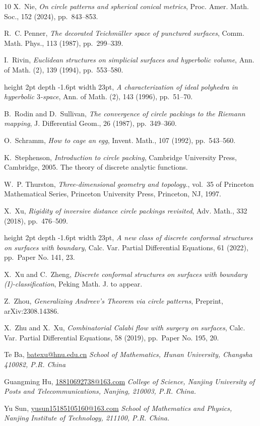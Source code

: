 \documentclass[11pt,leqno]{article}
\makeatletter
\numberwithin{equation}{section}
\newcommand{\Addresses}{{
  \bigskip
  \footnotesize
  \noindent Te Ba, \href{batexu@hnu.edu.cn}{batexu@hnu.edu.cn}
  \newline\textit{School of Mathematics, Hunan University, Changsha 410082, P.R. China}\par\nopagebreak
  \medskip
  \noindent Guangming Hu, \href{18810692738@163.com}{18810692738@163.com}
 \newline\textit{ College of Science, Nanjing University of Posts and Telecommunications,
  Nanjing, 210003, P.R. China.}\par\nopagebreak
  \medskip
 \noindent Yu Sun, \href{yusun15185105160@163.com}{yusun15185105160@163.com}
  \newline\textit{School of Mathematics and Physics, Nanjing Institute of Technology, 211100, P.R. China.}\par\nopagebreak
}}
\theoremstyle{definition}
\makeatother
\begin{document}
\begin{thebibliography}{10}
{\sc X.~Nie}, {\em On circle patterns and spherical conical metrics}, Proc.
  Amer. Math. Soc., 152 (2024), pp.~843--853.

{\sc R.~C. Penner}, {\em The decorated {T}eichm\"uller space of punctured
  surfaces}, Comm. Math. Phys., 113 (1987), pp.~299--339.

{\sc I.~Rivin}, {\em Euclidean structures on simplicial surfaces and hyperbolic
  volume}, Ann. of Math. (2), 139 (1994), pp.~553--580.

\leavevmode\vrule height 2pt depth -1.6pt width 23pt, {\em A characterization
  of ideal polyhedra in hyperbolic {$3$}-space}, Ann. of Math. (2), 143 (1996),
  pp.~51--70.

{\sc B.~Rodin and D.~Sullivan}, {\em The convergence of circle packings to the
  {R}iemann mapping}, J. Differential Geom., 26 (1987), pp.~349--360.

{\sc O.~Schramm}, {\em How to cage an egg}, Invent. Math., 107 (1992),
  pp.~543--560.

{\sc K.~Stephenson}, {\em Introduction to circle packing}, Cambridge University
  Press, Cambridge, 2005.
\newblock The theory of discrete analytic functions.

{\sc W.~P. Thurston}, {\em Three-dimensional geometry and topology.}, vol.~35
  of Princeton Mathematical Series, Princeton University Press, Princeton, NJ,
  1997.

{\sc X.~Xu}, {\em Rigidity of inversive distance circle packings revisited},
  Adv. Math., 332 (2018), pp.~476--509.

\leavevmode\vrule height 2pt depth -1.6pt width 23pt, {\em A new class of
  discrete conformal structures on surfaces with boundary}, Calc. Var. Partial
  Differential Equations, 61 (2022), pp.~Paper No. 141, 23.

{\sc X.~Xu and C.~Zheng}, {\em Discrete conformal structures on surfaces with
  boundary \textup{(I)}-classification}, Peking Math. J.
\newblock to appear.

{\sc Z.~Zhou}, {\em Generalizing {Andreev}'s {Theorem} via circle patterns},
  Preprint, arXiv:2308.14386.

{\sc X.~Zhu and X.~Xu}, {\em Combinatorial {C}alabi flow with surgery on
  surfaces}, Calc. Var. Partial Differential Equations, 58 (2019), pp.~Paper
  No. 195, 20.

\end{thebibliography}

\Addresses
\end{document}
